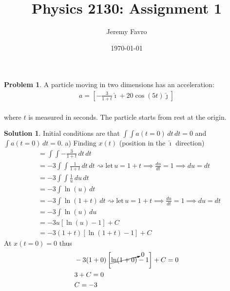 \documentclass[10pt]{article}
\title{Physics 2130: Assignment 1}
\author{Jeremy Favro}
\date{\today}
\theoremstyle{definition}
\newtheorem{problem}{Problem}
\newtheorem{soln}{Solution}
\newcommand{\ihat}{\boldsymbol{\hat{\imath}}}
\newcommand{\jhat}{\boldsymbol{\hat{\jmath}}}
\begin{document}
\maketitle

\begin{problem}
A particle moving in two dimensions has an acceleration:
\begin{align*}
     {a} = \left[-\frac{3}{1+t}\ihat+20\cos(5t)\jhat\right]
\end{align*} \\
where $t$ is measured in seconds. The particle starts from rest at the origin.
\end{problem}
\begin{soln}
     Initial conditions are that $\int \int {a}(t=0) \,dt \,dt=0$ and $\int {a}(t=0) \,dt=0$.
     a) Finding $x(t)$ (position in the $\ihat$ direction)
     \begin{align*}
           & = \int \int -\frac{3}{1+t} \,dt\,dt                                                                                \\
           & = -3\int \int \frac{1}{1+t} \,dt\,dt \rightsquigarrow \mathrm{ let} \, u=1+t \implies\frac{du}{dt}=1\implies du=dt \\
           & = -3\int \int \frac{1}{u} \,du\,dt                                                                                 \\
           & = -3\int \ln(u) \,dt                                                                                               \\
           & = -3\int \ln(1+t) \,dt \rightsquigarrow \mathrm{ let} \, u=1+t \implies\frac{du}{dt}=1\implies du=dt               \\
           & = -3\int \ln(u) \,du                                                                                               \\
           & = -3u\left[\ln(u)-1\right] + C                                                                                     \\
           & = -3(1+t)\left[\ln(1+t)-1\right] + C
     \end{align*}
     At $x(t=0)=0$ thus
     \begin{align*}
           & -3(1+0)\left[\cancelto{0}{\ln(1+0)}-1\right] + C=0 \\
           & 3 + C=0                                            \\
           & C=-3
     \end{align*}

\end{soln}
\end{document}

